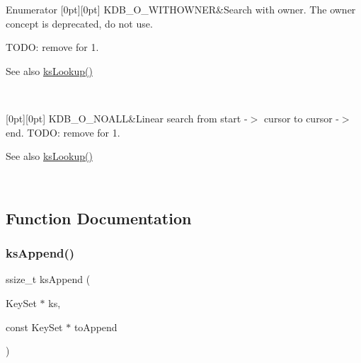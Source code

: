 \begin{DoxyEnumFields}{Enumerator}
[0pt][0pt]{}\mbox{\label{group__keyset_gga98a3d6a4016c9dad9cbd1a99a9c2a45aab2ff402f5de9aa67b7f786fb715a7a31}} 
K\+D\+B\+\_\+\+O\+\_\+\+W\+I\+T\+H\+O\+W\+N\+ER&Search with owner. The owner concept is deprecated, do not use.

T\+O\+DO\+: remove for 1.

\begin{DoxySeeAlso}{See also}
\hyperlink{group__keyset_gaa34fc43a081e6b01e4120daa6c112004}{ks\+Lookup()} 
\end{DoxySeeAlso}
\\
\hline

[0pt][0pt]{}\mbox{\label{group__keyset_gga98a3d6a4016c9dad9cbd1a99a9c2a45aae8dd1961707e7d0c27228a3f98b0a94d}} 
K\+D\+B\+\_\+\+O\+\_\+\+N\+O\+A\+LL&Linear search from start -\/$>$ cursor to cursor -\/$>$ end. T\+O\+DO\+: remove for 1.

\begin{DoxySeeAlso}{See also}
\hyperlink{group__keyset_gaa34fc43a081e6b01e4120daa6c112004}{ks\+Lookup()} 
\end{DoxySeeAlso}
\\
\hline

\end{DoxyEnumFields}


\subsection{Function Documentation}
\mbox{\label{group__keyset_ga21eb9c3a14a604ee3a8bdc779232e7b7}} 
\subsubsection{\texorpdfstring{ks\+Append()}{ksAppend()}}
{\footnotesize\ttfamily ssize\+\_\+t ks\+Append (\begin{DoxyParamCaption}\item[{Key\+Set $\ast$}]{ks,  }\item[{const Key\+Set $\ast$}]{to\+Append }\end{DoxyParamCaption})}



